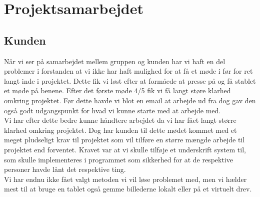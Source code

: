 \documentclass[a4paper]{article}
\begin{document}
\section{Projektsamarbejdet}
\subsection{Kunden}
Når vi ser på samarbejdet mellem gruppen og kunden har vi haft en del problemer i forstanden at vi ikke har haft mulighed for at få et møde i før for ret langt inde i projektet. Dette fik vi løst efter at formåede at presse på og få stablet et møde på benene. Efter det første møde 4/5 fik vi få langt støre klarhed omkring projektet. Før dette havde vi blot en email at arbejde ud fra dog gav den også godt udgangspunkt for hvad vi kunne starte med at arbejde med.\\
Vi har efter dette bedre kunne håndtere arbejdet da vi har fået langt større klarhed omkring projektet. Dog har kunden til dette mødet kommet med et meget pludseligt krav til projektet som vil tilføre en større mængde arbejde til projektet end forventet. Kravet var at vi skulle tilføje et underskrift system til, som skulle implementeres i programmet som sikkerhed for at de respektive personer havde lånt det respektive ting.\\
Vi har endnu ikke fået valgt metoden vi vil løse problemet med, men vi hælder mest til at bruge en tablet også gemme billederne lokalt eller på et virtuelt drev.\\
\end{document}
